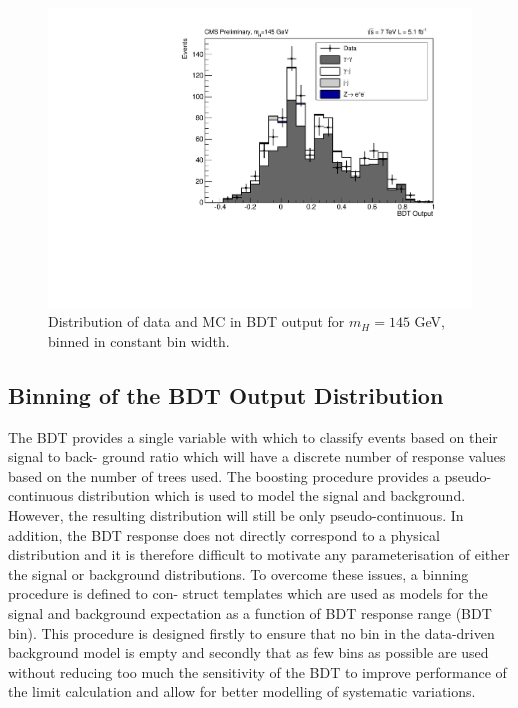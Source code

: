 \begin{figure}
 \begin{centering}
  \includegraphics[width=\textwidth]{hgg7TeV/sidebandMvaPlots/data-mc-sbsum-mh145}
 \end{centering}
 \caption{Distribution of data and MC in BDT output for $m_{H}=145$ GeV, binned in constant bin width.}
 \label{fig:datamcagreement_sidebandBDT}
\end{figure}

\subsection{Binning of the BDT Output Distribution}

The BDT provides a single variable with which to classify events based on their signal to back-
ground ratio which will have a discrete number of response values based on the number of
trees used. The boosting procedure provides a pseudo-continuous distribution which is used
to model the signal and background. However, the resulting distribution will still be only
pseudo-continuous. In addition, the BDT response does not directly correspond to a physical
distribution and it is therefore difficult to motivate any parameterisation of either the signal
or background distributions. To overcome these issues, a binning procedure is defined to con-
struct templates which are used as models for the signal and background expectation as a
function of BDT response range (BDT bin). This procedure is designed firstly to ensure that no
bin in the data-driven background model is empty and secondly that as few bins as possible
are used without reducing too much the sensitivity of the BDT to improve performance of the
limit calculation and allow for better modelling of systematic variations.

